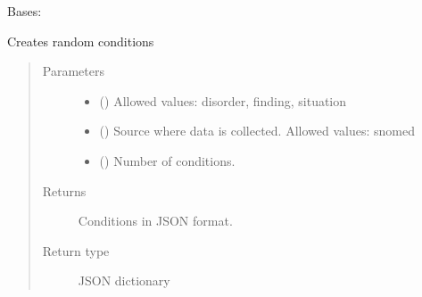 \documentclass[letterpaper,10pt,english]{sphinxmanual}
\begin{document}
\begin{fulllineitems}
\label{\detokenize{CE_app.synth_phr:CE_app.synth_phr.functions.Domains}}
\sphinxAtStartPar
Bases: 

\begin{fulllineitems}
\label{\detokenize{CE_app.synth_phr:CE_app.synth_phr.functions.Domains.condition}}
\sphinxAtStartPar
Creates random conditions
\begin{quote}\begin{description}
\item[{Parameters}] \leavevmode\begin{itemize}
\item {} 
\sphinxAtStartPar
{} () \textendash{} Allowed values: disorder, finding, situation

\item {} 
\sphinxAtStartPar
{} () \textendash{} Source where data is collected. Allowed values: snomed

\item {} 
\sphinxAtStartPar
{} () \textendash{} Number of conditions.

\end{itemize}

\item[{Returns}] \leavevmode
\sphinxAtStartPar
Conditions in JSON format.

\item[{Return type}] \leavevmode
\sphinxAtStartPar
JSON dictionary

\end{description}\end{quote}

\end{fulllineitems}


\end{fulllineitems}
\end{document}
